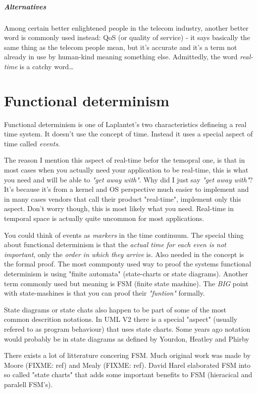 \paragraph{Alternatives}
Among certain better enlightened people in the telecom industry, another better word is commonly used instead: QoS (or quality of service)  - it says basically the same thing as the telecom people mean, but it's accurate and it's a term not already in use by human-kind meaning something else. Admittedly, the word \textit{real-time} is a catchy word\ldots

\chapter{Functional determinism}
Functional determinism is one of Laplantet's two characteristics defineing a real time system. It doesn't use the concept of time. Instead it uses a special aspect of time called \textit{events}. 

The reason I mention this aspect of real-time befor the temopral one, is that in most cases when you actually need your application to be real-time, this is what you need and will be able to \textit{"get away with"}. Why did I just say \textit{"get away with"}? It's because it's from a kernel and OS perspective much easier to implement and in many cases vendors that call their product "real-time", implement only this aspect. Don't worry though, this is most likely what you need. Real-time in temporal space is actually quite uncommon for most applications.

You could think of events as \textit{markers} in the time continuum. The special thing about functional determinism is that the \textit{actual time for each even is not important}, only the \textit{order in which they arrive} is.
Also needed in the concept is the formal proof. The most commponty used way to proof the systems functional determinism is using "finite automata" (state-charts or state diagrams). Another term commonly used but meaning is FSM (finite state mashine). The \textit{BIG} point with state-mashines is that you can proof their \textit{"funtion"} formally.

State diagrams or state chats also happen to be part of some of the most common descrition notations. In UML V2 there is a special "aspect" (usually refered to as program behaviour) that uses state charts. Some years ago notation would probably be in state diagrams as defined by Yourdon, Heatley and Phirby 

There exists a lot of litterature concering FSM. Much original work was made by Moore (FIXME: ref) and Mealy (FIXME: ref). David Harel elaborated FSM into so called "state charts" that adds some important benefits to FSM (hieracical and paralell FSM's).

